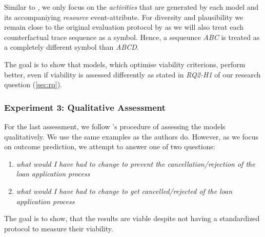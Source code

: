 \documentclass[./../../paper.tex]{subfiles}
\begin{document}
Similar to \citeauthor{hsieh_DiCE4ELInterpretingProcess_2021}, we only focus on the \emph{activities} that are generated by each model and its accompaniying \emph{resource} event-attribute. For diversity and plausibility we remain close to the original evaluation protocol by \citeauthor{hsieh_DiCE4ELInterpretingProcess_2021} as we will also treat each counterfactual trace sequence as a symbol. Hence, a sequeunce \emph{ABC} is treated as a completely different symbol than \emph{ABCD}.

The goal is to show that models, which optimise viability criterions, perform better, even if viability is assessed differently as stated in \emph{RQ2-H1} of our research question (\autoref{sec:rq}). 

\subsubsection{Experiment 3: Qualitative Assessment}
For the last assessment, we follow \citeauthor{hsieh_DiCE4ELInterpretingProcess_2021}'s procedure of assessing the models qualitatively. We use the same examples as the authors do. However, as we focus on outcome prediction, we attempt to answer one of two questions: 

\begin{enumerate}
    \item \emph{what would I have had to change to prevent the cancellation/rejection of the loan application process}
    \item \emph{what would I have had to change to get cancelled/rejected of the loan application process}
\end{enumerate}

The goal is to show, that the results are viable despite not having a standardized protocol to measure their viability.
\end{document}

